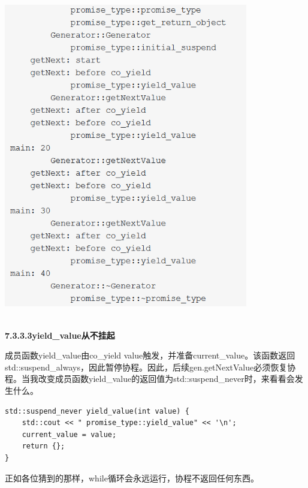 \begin{center}
\includegraphics[width=0.8\textwidth]{content/3/chapter7/images/16.png}\\
\end{center}

\hspace*{\fill} \\ %
\noindent
\textbf{7.3.3.3\hspace{0.2cm}yield\_value从不挂起}

成员函数yield\_value由co\_yield value触发，并准备current\_value。该函数返回std::suspend\_always，因此暂停协程。因此，后续gen.getNextValue必须恢复协程。当我改变成员函数yield\_value的返回值为std::suspend\_never时，来看看会发生什么。

\begin{lstlisting}[style=styleCXX]
std::suspend_never yield_value(int value) {
	std::cout << " promise_type::yield_value" << '\n';
	current_value = value;
	return {};
}
\end{lstlisting}

正如各位猜到的那样，while循环会永远运行，协程不返回任何东西。

